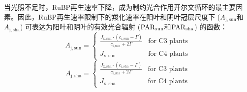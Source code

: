 当光照不足时，RuBP再生速率下降，成为制约光合作用开尔文循环的最主要因素。因此，RuBP再生速率限制下的羧化速率在阳叶和阴叶冠层尺度下 ($A_{\mathrm{j,sun}}$和$A_{\mathrm{j,sha}}$) 可表达为阳叶和阴叶的有效光合辐射 (${\rm PAR}_{\mathrm{sun}}$和${\rm PAR}_{\mathrm{sha}}$) 的函数：
\begin{equation}\label{A_J1sun}
A_{\mathrm{j,sun}}=\begin{cases}\frac{J_{\mathrm{x,sun}}\cdot\left(c_{\mathrm{i,sun}}-\Gamma\right)}{c_{\mathrm{i,sun}}+2\Gamma}
     & \text{for C3 plants} \\
J_{\mathrm{x,sun}} & \text{for C4 plants}
\end{cases}
\end{equation}
\begin{equation}\label{A_J1sha}
A_{\mathrm{j,sha}}=\begin{cases}\frac{J_{\mathrm{x,sha}}\cdot\left(c_{\mathrm{i,sha}}-\Gamma\right)}{c_{\mathrm{i,sha}}+2\Gamma}
     & \text{for C3 plants} \\
J_{\mathrm{x,sha}} & \text{for C4 plants}
\end{cases}
\end{equation}

